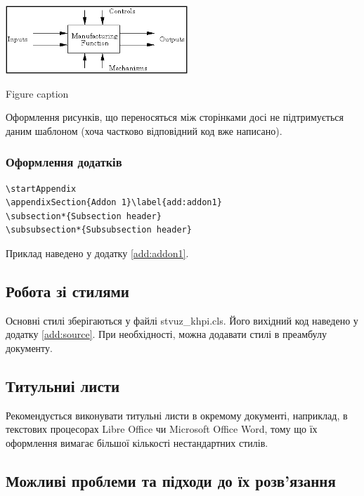 \begin{stdfigure}
\includegraphics[width=2.7in]{images/idef_fb.png}
\caption{Figure caption}
\label{fig:idef_fb}
\end{stdfigure}

Оформлення рисунків, що переносяться між сторінками досі не підтримується даним
шаблоном (хоча частково відповідний код вже написано).

\subsubsection{Оформлення додатків}

\begin{lstlisting}
\startAppendix
\appendixSection{Addon 1}\label{add:addon1} 
\subsection*{Subsection header}
\subsubsection*{Subsubsection header}
\end{lstlisting}

Приклад наведено у додатку \ref{add:addon1}.

\subsection{Робота зі стилями}

Основні стилі зберігаються у файлі stvuz\_khpi.cls.
Його вихідний код наведено у додатку \ref{add:source}. При необхідності, можна
додавати стилі в преамбулу документу.

\subsection{Титульниі листи}

Рекомендується виконувати титульні листи в окремому документі, наприклад, в
текстових процесорах Libre Office чи Microsoft Office Word, тому що їх
оформлення вимагає більшої кількості нестандартних стилів.

\subsection{Можливі проблеми та підходи до їх розв'язання}

